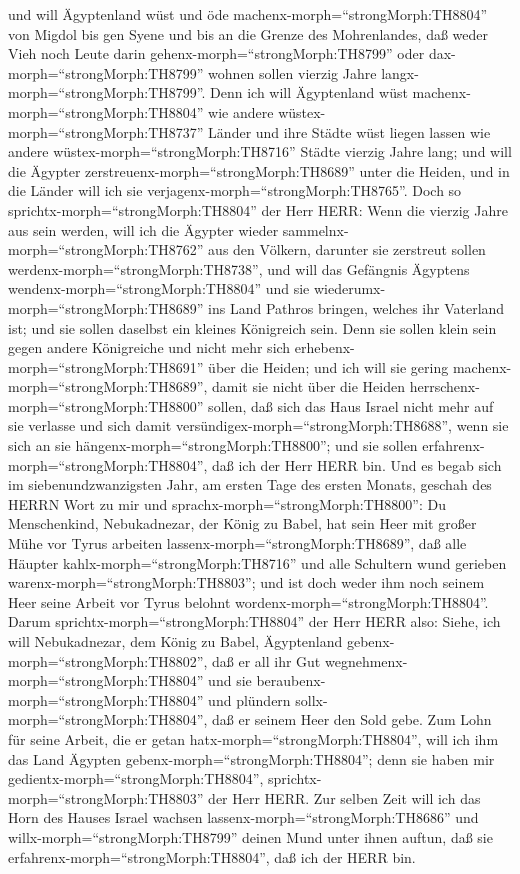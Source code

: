 und will Ägyptenland wüst und öde machenx-morph=``strongMorph:TH8804''
von Migdol bis gen Syene und bis an die Grenze des Mohrenlandes,
 daß weder Vieh noch Leute darin
gehenx-morph=``strongMorph:TH8799'' oder
dax-morph=``strongMorph:TH8799'' wohnen sollen vierzig Jahre
langx-morph=``strongMorph:TH8799''.  Denn ich will
Ägyptenland wüst machenx-morph=``strongMorph:TH8804'' wie andere
wüstex-morph=``strongMorph:TH8737'' Länder und ihre Städte wüst liegen
lassen wie andere wüstex-morph=``strongMorph:TH8716'' Städte vierzig
Jahre lang; und will die Ägypter
zerstreuenx-morph=``strongMorph:TH8689'' unter die Heiden, und in die
Länder will ich sie verjagenx-morph=``strongMorph:TH8765''.
 Doch so sprichtx-morph=``strongMorph:TH8804'' der Herr
HERR: Wenn die vierzig Jahre aus sein werden, will ich die Ägypter
wieder sammelnx-morph=``strongMorph:TH8762'' aus den Völkern, darunter
sie zerstreut sollen werdenx-morph=``strongMorph:TH8738'', 
und will das Gefängnis Ägyptens wendenx-morph=``strongMorph:TH8804'' und
sie wiederumx-morph=``strongMorph:TH8689'' ins Land Pathros bringen,
welches ihr Vaterland ist; und sie sollen daselbst ein kleines
Königreich sein.  Denn sie sollen klein sein gegen andere
Königreiche und nicht mehr sich erhebenx-morph=``strongMorph:TH8691''
über die Heiden; und ich will sie gering
machenx-morph=``strongMorph:TH8689'', damit sie nicht über die Heiden
herrschenx-morph=``strongMorph:TH8800'' sollen,  daß sich
das Haus Israel nicht mehr auf sie verlasse und sich damit
versündigex-morph=``strongMorph:TH8688'', wenn sie sich an sie
hängenx-morph=``strongMorph:TH8800''; und sie sollen
erfahrenx-morph=``strongMorph:TH8804'', daß ich der Herr HERR bin.
 Und es begab sich im siebenundzwanzigsten Jahr, am ersten
Tage des ersten Monats, geschah des HERRN Wort zu mir und
sprachx-morph=``strongMorph:TH8800'':  Du Menschenkind,
Nebukadnezar, der König zu Babel, hat sein Heer mit großer Mühe vor
Tyrus arbeiten lassenx-morph=``strongMorph:TH8689'', daß alle Häupter
kahlx-morph=``strongMorph:TH8716'' und alle Schultern wund gerieben
warenx-morph=``strongMorph:TH8803''; und ist doch weder ihm noch seinem
Heer seine Arbeit vor Tyrus belohnt
wordenx-morph=``strongMorph:TH8804''.  Darum
sprichtx-morph=``strongMorph:TH8804'' der Herr HERR also: Siehe, ich
will Nebukadnezar, dem König zu Babel, Ägyptenland
gebenx-morph=``strongMorph:TH8802'', daß er all ihr Gut
wegnehmenx-morph=``strongMorph:TH8804'' und sie
beraubenx-morph=``strongMorph:TH8804'' und plündern
sollx-morph=``strongMorph:TH8804'', daß er seinem Heer den Sold gebe.
 Zum Lohn für seine Arbeit, die er getan
hatx-morph=``strongMorph:TH8804'', will ich ihm das Land Ägypten
gebenx-morph=``strongMorph:TH8804''; denn sie haben mir
gedientx-morph=``strongMorph:TH8804'',
sprichtx-morph=``strongMorph:TH8803'' der Herr HERR.  Zur
selben Zeit will ich das Horn des Hauses Israel wachsen
lassenx-morph=``strongMorph:TH8686'' und
willx-morph=``strongMorph:TH8799'' deinen Mund unter ihnen auftun, daß
sie erfahrenx-morph=``strongMorph:TH8804'', daß ich der HERR bin.

